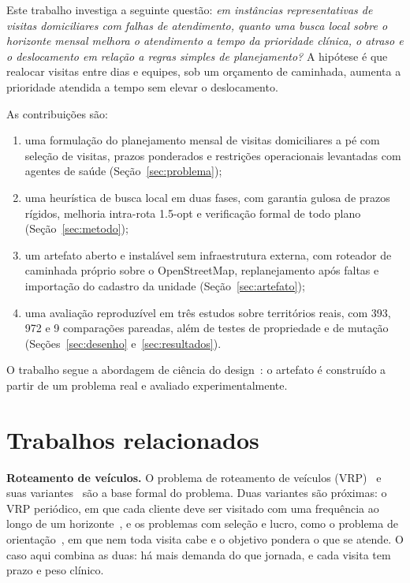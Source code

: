 \documentclass[conference,a4paper]{IEEEtran}
\begin{document}
Este trabalho investiga a seguinte questão: \emph{em instâncias representativas de visitas domiciliares com falhas de atendimento, quanto uma busca local sobre o horizonte mensal melhora o atendimento a tempo da prioridade clínica, o atraso e o deslocamento em relação a regras simples de planejamento?} A hipótese é que realocar visitas entre dias e equipes, sob um orçamento de caminhada, aumenta a prioridade atendida a tempo sem elevar o deslocamento.

As contribuições são:
\begin{enumerate}
  \item uma formulação do planejamento mensal de visitas domiciliares a pé com seleção de visitas, prazos ponderados e restrições operacionais levantadas com agentes de saúde (Seção~\ref{sec:problema});
  \item uma heurística de busca local em duas fases, com garantia gulosa de prazos rígidos, melhoria intra-rota 1.5-opt e verificação formal de todo plano (Seção~\ref{sec:metodo});
  \item um artefato aberto e instalável sem infraestrutura externa, com roteador de caminhada próprio sobre o OpenStreetMap, replanejamento após faltas e importação do cadastro da unidade (Seção~\ref{sec:artefato});
  \item uma avaliação reproduzível em três estudos sobre territórios reais, com 393, 972 e 9 comparações pareadas, além de testes de propriedade e de mutação (Seções~\ref{sec:desenho} e~\ref{sec:resultados}).
\end{enumerate}

O trabalho segue a abordagem de ciência do design~\cite{hevner2004}: o artefato é construído a partir de um problema real e avaliado experimentalmente.

\section{Trabalhos relacionados}\label{sec:relacionados}

\textbf{Roteamento de veículos.} O problema de roteamento de veículos (VRP)~\cite{dantzig1959} e suas variantes~\cite{toth2014} são a base formal do problema. Duas variantes são próximas: o VRP periódico, em que cada cliente deve ser visitado com uma frequência ao longo de um horizonte~\cite{campbell2014}, e os problemas com seleção e lucro, como o problema de orientação~\cite{vansteenwegen2011}, em que nem toda visita cabe e o objetivo pondera o que se atende. O caso aqui combina as duas: há mais demanda do que jornada, e cada visita tem prazo e peso clínico.
\end{document}
